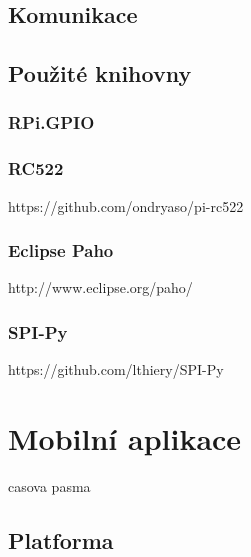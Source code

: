 \documentclass[czech,BP]{thesiskiv}
\begin{document}
	\section{Komunikace}
	
		
	
	
	\section{Použité knihovny}
		\subsection{RPi.GPIO}
		\label{subsec:prigpio}
		
		\subsection{RC522}
			https://github.com/ondryaso/pi-rc522
		\subsection{Eclipse Paho}
			http://www.eclipse.org/paho/
		\subsection{SPI-Py}
			https://github.com/lthiery/SPI-Py

\chapter{Mobilní aplikace}
	


casova pasma

	\section{Platforma}
	
	
	
\end{document}
